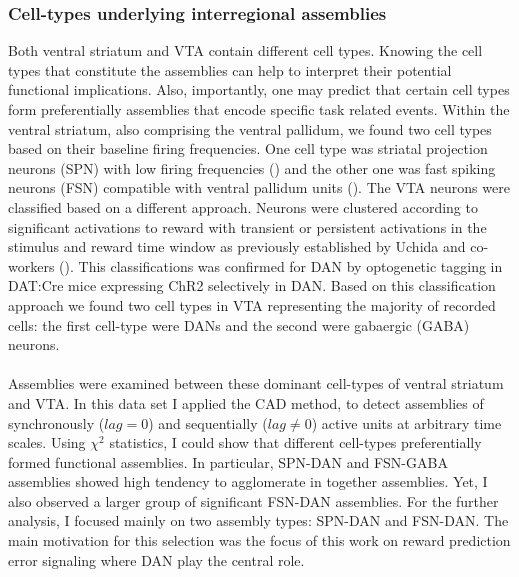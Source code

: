 \subsubsection{Cell-types underlying interregional assemblies} 
Both ventral striatum and VTA contain different cell types. Knowing the cell types that constitute the assemblies can help to interpret their potential functional implications. Also, importantly, one may predict that certain cell types form preferentially assemblies that encode specific task related events. Within the ventral striatum, also comprising the ventral pallidum, we found two cell types based on their baseline firing frequencies. One cell type was striatal projection neurons (SPN) with low firing frequencies (\cite{Kravitz}) and the other one was fast spiking neurons (FSN) compatible with ventral pallidum units (\cite{Heimer1982}). The VTA neurons were classified based on a different approach. Neurons were clustered according to significant activations to reward with transient or persistent activations in the stimulus and reward time window as previously established by Uchida and co-workers (\cite{Uchida}). This classifications was confirmed for DAN by optogenetic tagging in DAT:Cre mice expressing ChR2 selectively in DAN. Based on this classification approach we found two cell types in VTA representing the majority of recorded cells: the first cell-type were DANs and the second were gabaergic (GABA) neurons.\\\\
Assemblies were examined between these dominant cell-types of ventral striatum and VTA. In this data set I applied the CAD method, to detect assemblies of synchronously ($lag=0$) and sequentially ($lag\neq0$) active units at arbitrary time scales. Using $\chi^2$ statistics, I could show that different cell-types preferentially formed functional assemblies. In particular, SPN-DAN and FSN-GABA assemblies showed high tendency to agglomerate in together assemblies. Yet, I also observed a larger group of significant FSN-DAN assemblies. For the further analysis, I focused mainly on two assembly types: SPN-DAN and FSN-DAN. The main motivation for this selection was the focus of this work on reward prediction error signaling where DAN play the central role.\\\\ 
